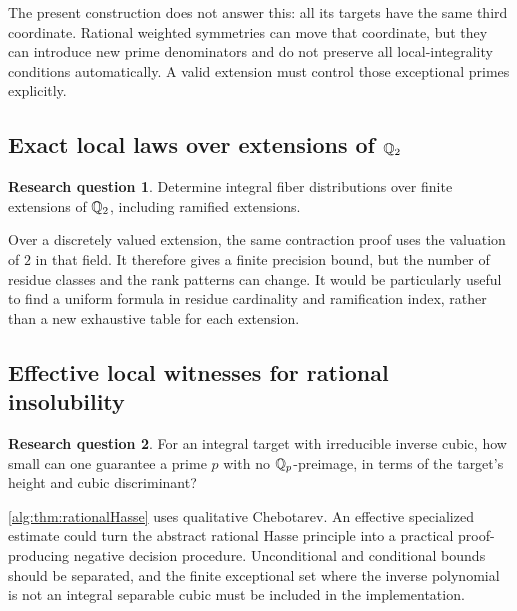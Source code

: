 \documentclass[11pt]{article}
\numberwithin{equation}{section}
\theoremstyle{plain}
\theoremstyle{plain}
\theoremstyle{plain}
\theoremstyle{definition}
\theoremstyle{definition}
\newtheorem{question}[question]{Research question}
\theoremstyle{definition}
\theoremstyle{remark}
\begin{document}
The present construction does not answer this: all its targets have the
same third coordinate. Rational weighted symmetries can move that
coordinate, but they can introduce new prime denominators and do not
preserve all local-integrality conditions automatically. A valid extension
must control those exceptional primes explicitly.

\subsection{Exact local laws over extensions of \texorpdfstring{$\mathbb Q_2$}{Q2}}\label{alg:sub:q-extensions}
\begin{question}
Determine integral fiber distributions over finite extensions of $\mathbb Q_2$,
including ramified extensions.
\end{question}

Over a discretely valued extension, the same contraction proof uses the
valuation of $2$ in that field. It therefore gives a finite precision
bound, but the number of residue classes and the rank patterns can
change. It would be particularly useful to find a uniform formula in
residue cardinality and ramification index, rather than a new exhaustive
table for each extension.

\subsection{Effective local witnesses for rational insolubility}
\begin{question}
For an integral target with irreducible inverse cubic, how small can one
guarantee a prime $p$ with no $\mathbb Q_p$-preimage, in terms of the target's
height and cubic discriminant?
\end{question}
\cref{alg:thm:rationalHasse} uses qualitative Chebotarev. An effective
specialized estimate could turn the abstract rational Hasse principle
into a practical proof-producing negative decision procedure. Unconditional
and conditional bounds should be separated, and the finite exceptional
set where the inverse polynomial is not an integral separable cubic
must be included in the implementation.
\end{document}
